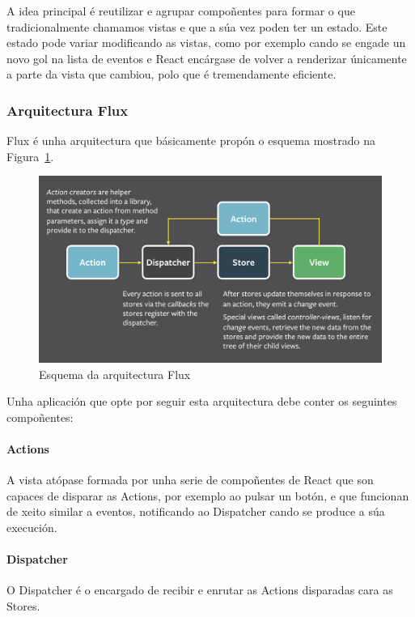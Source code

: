       A idea principal é reutilizar e agrupar compoñentes para formar o que 
tradicionalmente chamamos vistas e que a súa vez poden ter un estado.
      Este estado pode variar modificando as vistas, como por exemplo cando se 
engade un novo gol na lista de eventos e React encárgase de volver a 
renderizar únicamente a parte da vista que cambiou, polo que é tremendamente 
eficiente.

      \subsubsection{Arquitectura Flux}
      Flux\cite{book:flux} é unha arquitectura que básicamente propón o esquema 
mostrado na Figura~\ref{fig:img:flux}.

        \begin{figure}[h!]
          \begin{center}
          \includegraphics[width=\textwidth]{./img/flux.png}
          \caption{Esquema da arquitectura Flux}
          \label{fig:img:flux}
          \end{center}
        \end{figure}

      Unha aplicación que opte por seguir esta arquitectura debe conter os 
seguintes compoñentes:

        \paragraph{Actions}
        A vista atópase formada por unha serie de compoñentes de React que son 
capaces de disparar as Actions, por exemplo ao pulsar un botón, e que funcionan 
de xeito similar a eventos, notificando ao Dispatcher cando se produce a súa 
execución.
        \paragraph{Dispatcher}
        O Dispatcher é o encargado de recibir e enrutar as Actions disparadas 
cara as Stores.

